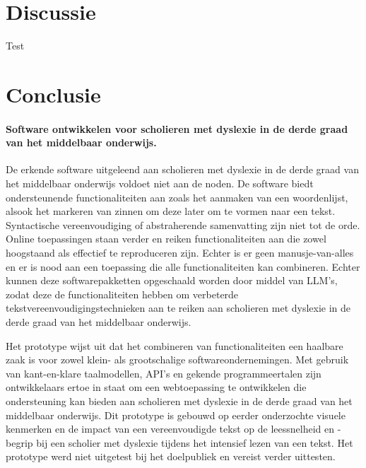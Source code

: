 \chapter{Discussie}
\label{ch:discussie}



Test







\chapter{Conclusie}%
\label{ch:conclusie}

\subsubsection{Software ontwikkelen voor scholieren met dyslexie in de derde graad van het middelbaar onderwijs.}

De erkende software uitgeleend aan scholieren met dyslexie in de derde graad van het middelbaar onderwijs voldoet niet aan de noden. De software biedt ondersteunende functionaliteiten aan zoals het aanmaken van een woordenlijst, alsook het markeren van zinnen om deze later om te vormen naar een tekst. Syntactische vereenvoudiging of abstraherende samenvatting zijn niet tot de orde. Online toepassingen staan verder en reiken functionaliteiten aan die zowel hoogstaand als effectief te reproduceren zijn. Echter is er geen manusje-van-alles en er is nood aan een toepassing die alle functionaliteiten kan combineren. Echter kunnen deze softwarepakketten opgeschaald worden door middel van LLM's, zodat deze de functionaliteiten hebben om verbeterde tekstvereenvoudigingstechnieken aan te reiken aan scholieren met dyslexie in de derde graad van het middelbaar onderwijs. 

\medskip

Het prototype wijst uit dat het combineren van functionaliteiten een haalbare zaak is voor zowel klein- als grootschalige softwareondernemingen. Met gebruik van kant-en-klare taalmodellen, API's en gekende programmeertalen zijn ontwikkelaars ertoe in staat om een webtoepassing te ontwikkelen die ondersteuning kan bieden aan scholieren met dyslexie in de derde graad van het middelbaar onderwijs. Dit prototype is gebouwd op eerder onderzochte visuele kenmerken en de impact van een vereenvoudigde tekst op de leessnelheid en -begrip bij een scholier met dyslexie tijdens het intensief lezen van een tekst. Het prototype werd niet uitgetest bij het doelpubliek en vereist verder uittesten. 

